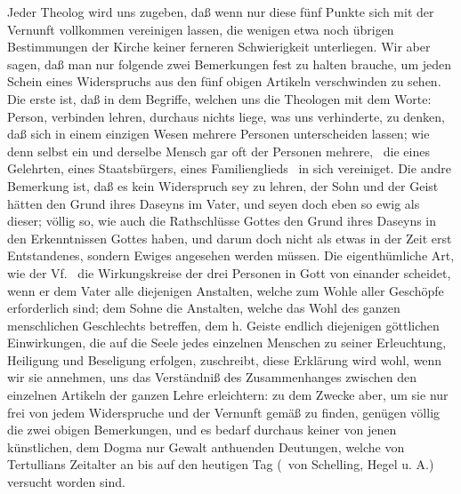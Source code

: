 Jeder Theolog wird uns zugeben, daß wenn nur diese fünf Punkte sich mit der Vernunft vollkommen vereinigen lassen, die wenigen etwa noch übrigen Bestimmungen der Kirche keiner ferneren Schwierigkeit unterliegen. Wir aber sagen, daß man nur folgende zwei Bemerkungen fest zu halten brauche, um jeden Schein eines Widerspruchs aus den fünf obigen Artikeln verschwinden zu sehen. Die erste ist, daß in dem Begriffe, welchen uns die Theologen mit dem Worte: Person, verbinden lehren, durchaus nichts liege, was uns verhinderte, zu denken, daß sich in einem einzigen Wesen mehrere Personen unterscheiden lassen; wie denn selbst ein und derselbe Mensch gar oft der Personen mehrere, \zB\ die eines Gelehrten, eines Staatsbürgers, eines Familienglieds \usw\ in sich vereiniget. Die andre Bemerkung ist, daß es kein Widerspruch sey zu lehren, der Sohn und der Geist hätten den Grund ihres Daseyns im Vater, und seyen doch eben so ewig als dieser; völlig so, wie auch die Rathschlüsse Gottes den Grund ihres Daseyns in den Erkenntnissen Gottes haben, und darum doch nicht als etwas in der Zeit erst Entstandenes, sondern Ewiges angesehen werden müssen. Die eigenthümliche Art, wie der Vf.\  die Wirkungskreise der drei Personen in Gott von einander scheidet, wenn er dem Vater alle diejenigen Anstalten, welche zum Wohle aller Geschöpfe erforderlich sind; dem Sohne die Anstalten, welche das Wohl des ganzen menschlichen Geschlechts betreffen, dem h. Geiste endlich diejenigen göttlichen Einwirkungen, die auf die Seele jedes einzelnen Menschen zu seiner Erleuchtung, Heiligung und Beseligung erfolgen, zuschreibt, diese Erklärung wird wohl, wenn wir sie annehmen, uns das Verständniß des Zusammenhanges zwischen den einzelnen Artikeln der ganzen Lehre erleichtern: zu dem Zwecke aber, um sie nur frei von jedem Widerspruche und der Vernunft gemäß zu finden, genügen völlig die zwei obigen Bemerkungen, und es bedarf  durchaus keiner von jenen künstlichen, dem Dogma nur Gewalt anthuenden Deutungen, welche von Tertullians Zeitalter an bis auf den heutigen Tag (\zB\ von Schelling, Hegel u. A.) versucht worden sind. \par
